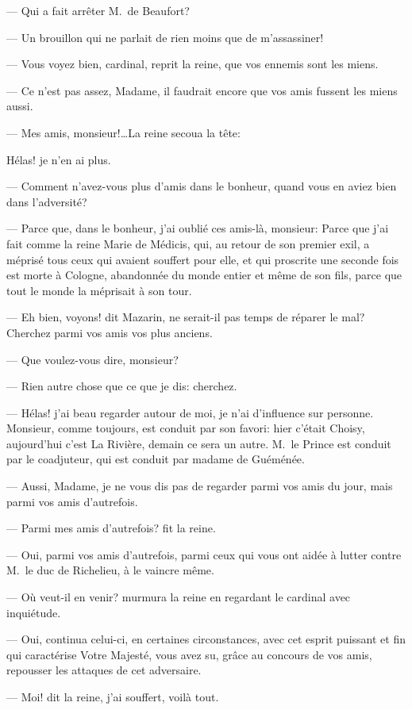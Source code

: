 — Qui a fait arrêter M.~de Beaufort?

— Un brouillon qui ne parlait de rien moins que de m'assassiner!

— Vous voyez bien, cardinal, reprit la reine, que vos ennemis sont les miens.

— Ce n'est pas assez, Madame, il faudrait encore que vos amis fussent les miens aussi.

— Mes amis, monsieur!\dots La reine secoua la tête:

Hélas! je n'en ai plus.

— Comment n'avez-vous plus d'amis dans le bonheur, quand vous en aviez bien dans l'adversité?

— Parce que, dans le bonheur, j'ai oublié ces amis-là, monsieur: Parce que j'ai fait comme la reine Marie de Médicis, qui, au retour de son premier exil, a méprisé tous ceux qui avaient souffert pour elle, et qui proscrite une seconde fois est morte à Cologne, abandonnée du monde entier et même de son fils, parce que tout le monde la méprisait à son tour.

— Eh bien, voyons! dit Mazarin, ne serait-il pas temps de réparer le mal? Cherchez parmi vos amis vos plus anciens.

— Que voulez-vous dire, monsieur?

— Rien autre chose que ce que je dis: cherchez.

— Hélas! j'ai beau regarder autour de moi, je n'ai d'influence sur personne. Monsieur, comme toujours, est conduit par son favori: hier c'était Choisy, aujourd'hui c'est La Rivière, demain ce sera un autre. M.~le Prince est conduit par le coadjuteur, qui est conduit par madame de Guéménée.

— Aussi, Madame, je ne vous dis pas de regarder parmi vos amis du jour, mais parmi vos amis d'autrefois.

— Parmi mes amis d'autrefois? fit la reine.

— Oui, parmi vos amis d'autrefois, parmi ceux qui vous ont aidée à lutter contre M.~le duc de Richelieu, à le vaincre même.

— Où veut-il en venir? murmura la reine en regardant le cardinal avec inquiétude.

— Oui, continua celui-ci, en certaines circonstances, avec cet esprit puissant et fin qui caractérise Votre Majesté, vous avez su, grâce au concours de vos amis, repousser les attaques de cet adversaire.

— Moi! dit la reine, j'ai souffert, voilà tout.

